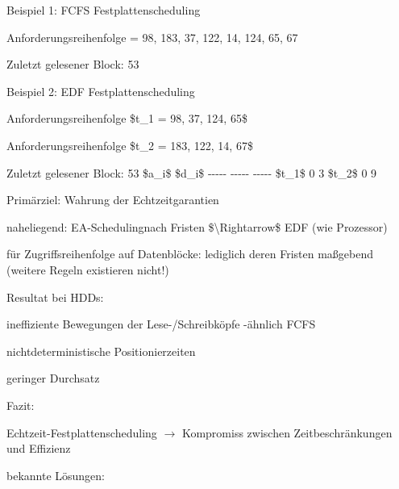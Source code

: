 \documentclass[a4paper]{article}
\begin{document}
\begin{multicols}{3}
    \begin{itemize*}
        \item
        Beispiel 1: FCFS Festplattenscheduling
        \begin{itemize*}
            \item Anforderungsreihenfolge = 98, 183, 37, 122, 14, 124, 65, 67
            \item Zuletzt gelesener Block: 53
        \end{itemize*}
        \item
        Beispiel 2: EDF Festplattenscheduling
        \begin{itemize*}
            \item Anforderungsreihenfolge \$t\_1 = 98, 37, 124, 65\$
            \item Anforderungsreihenfolge \$t\_2 = 183, 122, 14, 67\$
            \item Zuletzt gelesener Block: 53 \textbar{} \textbar{} \$a\_i\$ \textbar{} \$d\_i\$ \textbar{} \textbar{} -\/-\/-\/-\/- \textbar{} -\/-\/-\/-\/- \textbar{} -\/-\/-\/-\/- \textbar{} \textbar{} \$t\_1\$ \textbar{} 0 \textbar{} 3 \textbar{} \textbar{} \$t\_2\$ \textbar{} 0 \textbar{} 9 \textbar{}
        \end{itemize*}
        \item
        Primärziel: Wahrung der Echtzeitgarantien
        \begin{itemize*}
            \item naheliegend: EA-Schedulingnach Fristen \$\textbackslash Rightarrow\$ EDF (wie Prozessor)
            \item für Zugriffsreihenfolge auf Datenblöcke: lediglich deren Fristen maßgebend (weitere Regeln existieren nicht!)
        \end{itemize*}
        \item
        Resultat bei HDDs:
        \begin{itemize*}
            \item ineffiziente Bewegungen der Lese-/Schreibköpfe -ähnlich FCFS
            \item nichtdeterministische Positionierzeiten
            \item geringer Durchsatz
        \end{itemize*}
        \item
        Fazit:
        \begin{itemize*}
            \item Echtzeit-Festplattenscheduling $\rightarrow$  Kompromiss zwischen Zeitbeschränkungen und Effizienz
        \end{itemize*}
        \item
        bekannte Lösungen:
        \begin{enumerate*}


\end{enumerate*}
\end{itemize*}
\end{multicols}
\end{document}
